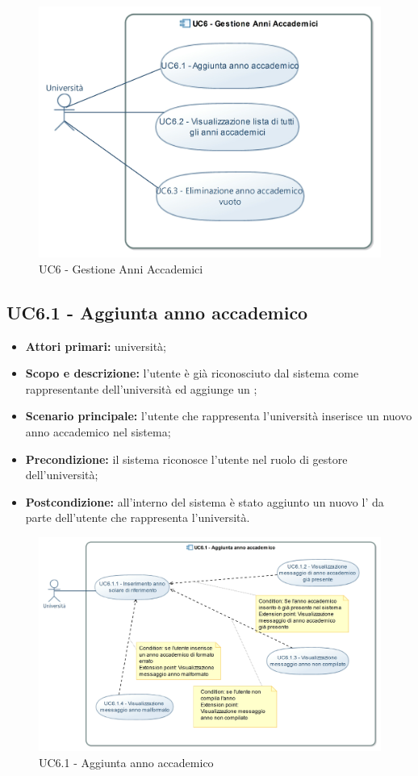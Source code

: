 \documentclass[AnalisiDeiRequisiti.tex]{subfiles}
\begin{document}
\begin{figure}[H]
	\centering
	\includegraphics[width=0.8\linewidth]{UC6.jpg}
	\caption{UC6 - Gestione Anni Accademici}
	\label{fig:UC6 - Gestione Anni Accademici}
\end{figure}

\subsection{UC6.1 - Aggiunta anno accademico}
\begin{itemize}
	\item \textbf{Attori primari:} università;
	\item \textbf{Scopo e descrizione:} l'utente è già riconosciuto dal sistema come rappresentante dell'università ed aggiunge un ;
	\item \textbf{Scenario principale:} l'utente che rappresenta l'università inserisce un nuovo anno accademico nel sistema;
	\item \textbf{Precondizione:} il sistema riconosce l'utente nel ruolo di gestore dell'università; 
	\item \textbf{Postcondizione:} all'interno del sistema è stato aggiunto un nuovo l' da parte dell'utente che rappresenta l'università.
\end{itemize}

\begin{figure}[H]
	\centering
	\includegraphics[width=1.1\linewidth]{UC6_1.jpg}
	\caption{UC6.1 - Aggiunta anno accademico}
	\label{fig:UC6.1 - Aggiunta anno accademico}
\end{figure}
\end{document}
